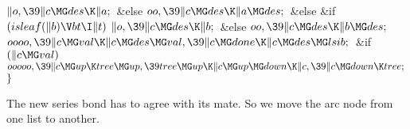 ${}\|o,\39\|c\MG\\{des}\K\|a;{}$\2\6
\&{else}\1\5
${}\\{oo},\39\|c\MG\\{des}\K\|a\MG\\{des};{}$\2\2\6
\&{else} \&{if} ${}(\\{isleaf}(\|b)\V\\{bt}\I\|t){}$\1\5
${}\|o,\39\|c\MG\\{des}\K\|b;{}$\2\6
\&{else}\1\5
${}\\{oo},\39\|c\MG\\{des}\K\|b\MG\\{des};{}$\2\6
${}\\{oooo},\39\|c\MG\\{val}\K\|c\MG\\{des}\MG\\{val},\39\|c\MG\\{done}\K\|c\MG%
\\{des}\MG\\{lsib};{}$\6
\&{if} ${}(\|c\MG\\{val}){}$\1\5
${}\\{ooooo},\39\|c\MG\\{up}\K\\{tree}\MG\\{up},\39\\{tree}\MG\\{up}\K\|c\MG%
\\{up}\MG\\{down}\K\|c,\39\|c\MG\\{down}\K\\{tree};{}$\2\6
\4${}\}{}$\2\par
\fi

The new series bond has to agree with its mate. So we
move
the arc node  from one list to another.

